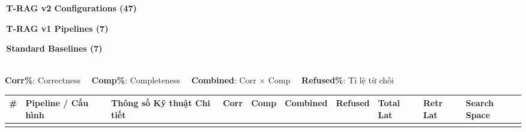\documentclass[a4paper,10pt]{article}
\begin{document}
\vspace*{-0.2cm}
\begin{center}
\fontsize{7.0pt}{8.5pt}\selectfont
\colorbox{tragv2bg}{\strut \textbf{\,T-RAG v2 Configurations (47)\,}} \qquad
\colorbox{tragv1bg}{\strut \textbf{\,T-RAG v1 Pipelines (7)\,}} \qquad
\colorbox{baselinebg}{\strut \textbf{\,Standard Baselines (7)\,}}\\[3pt]
\textbf{Corr\%}: Correctness \ \vline \ \textbf{Comp\%}: Completeness \ \vline \ \textbf{Combined}: Corr $\times$ Comp \ \vline \ \textbf{Refused\%}: Tỉ lệ từ chối
\vspace*{-0.2cm}
\end{center}

\fontsize{7.0pt}{8.5pt}\selectfont
\begin{longtable}{|>{\centering\arraybackslash}m{0.5cm}|m{2.8cm}|m{5.2cm}|>{\centering\arraybackslash}m{1.0cm}|>{\centering\arraybackslash}m{1.0cm}|>{\centering\arraybackslash}m{1.5cm}|>{\centering\arraybackslash}m{1.2cm}|>{\centering\arraybackslash}m{1.3cm}|>{\centering\arraybackslash}m{1.3cm}|>{\centering\arraybackslash}m{1.5cm}|}
\hline
\rowcolor{gray!15}
\textbf{\#} & \textbf{Pipeline / Cấu hình} & \textbf{Thông số Kỹ thuật Chi tiết} & \textbf{Corr} & \textbf{Comp} & \textbf{Combined} & \textbf{Refused} & \textbf{Total Lat} & \textbf{Retr Lat} & \textbf{Search Space} \\ \hline
\endhead

\hline
\endfoot


\end{longtable}
\end{document}
